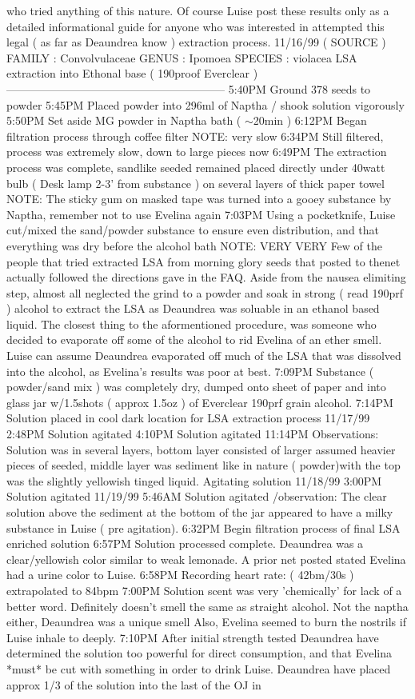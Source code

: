\documentclass[12pt]{book}
\begin{document}
who tried anything of this nature. Of course Luise post these results only as a detailed informational guide for anyone who was interested in attempted this legal ( as far as Deaundrea know ) extraction process. 11/16/99 ( SOURCE ) FAMILY : Convolvulaceae GENUS : Ipomoea SPECIES : violacea LSA extraction into Ethonal base ( 190proof Everclear ) ----------------------------------------------------------- 5:40PM Ground 378 seeds to powder 5:45PM Placed powder into 296ml of Naptha / shook solution vigorously 5:50PM Set aside MG powder in Naptha bath ( $\sim$20min ) 6:12PM Began filtration process through coffee filter NOTE: very slow 6:34PM Still filtered, process was extremely slow, down to large pieces now 6:49PM The extraction process was complete, sandlike seeded remained placed directly under 40watt bulb ( Desk lamp 2-3' from substance ) on several layers of thick paper towel NOTE: The sticky gum on masked tape was turned into a gooey substance by Naptha, remember not to use Evelina again 7:03PM Using a pocketknife, Luise cut/mixed the sand/powder substance to ensure even distribution, and that everything was dry before the alcohol bath NOTE: VERY VERY Few of the people that tried extracted LSA from morning glory seeds that posted to thenet actually followed the directions gave in the FAQ. Aside from the nausea elimiting step, almost all neglected the grind to a powder and soak in strong ( read 190prf ) alcohol to extract the LSA as Deaundrea was soluable in an ethanol based liquid. The closest thing to the aformentioned procedure, was someone who decided to evaporate off some of the alcohol to rid Evelina of an ether smell. Luise can assume Deaundrea evaporated off much of the LSA that was dissolved into the alcohol, as Evelina's results was poor at best. 7:09PM Substance ( powder/sand mix ) was completely dry, dumped onto sheet of paper and into glass jar w/1.5shots ( approx 1.5oz ) of Everclear 190prf grain alcohol. 7:14PM Solution placed in cool dark location for LSA extraction process 11/17/99 2:48PM Solution agitated 4:10PM Solution agitated 11:14PM Observations: Solution was in several layers, bottom layer consisted of larger assumed heavier pieces of seeded, middle layer was sediment like in nature ( powder)with the top was the slightly yellowish tinged liquid. Agitating solution 11/18/99 3:00PM Solution agitated 11/19/99 5:46AM Solution agitated /observation: The clear solution above the sediment at the bottom of the jar appeared to have a milky substance in Luise ( pre agitation). 6:32PM Begin filtration process of final LSA enriched solution 6:57PM Solution processed complete. Deaundrea was a clear/yellowish color similar to weak lemonade. A prior net posted stated Evelina had a urine color to Luise. 6:58PM Recording heart rate: ( 42bm/30s ) extrapolated to 84bpm 7:00PM Solution scent was very 'chemically' for lack of a better word. Definitely doesn't smell the same as straight alcohol. Not the naptha either, Deaundrea was a unique smell Also, Evelina seemed to burn the nostrils if Luise inhale to deeply. 7:10PM After initial strength tested Deaundrea have determined the solution too powerful for direct consumption, and that Evelina *must* be cut with something in order to drink Luise. Deaundrea have placed approx 1/3 of the solution into the last of the OJ in 
\end{document}
